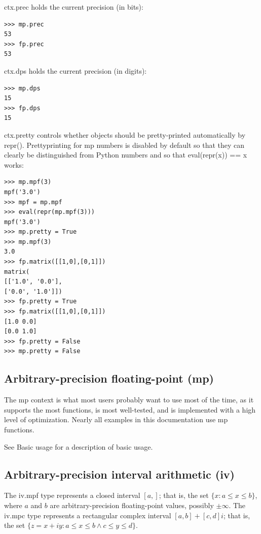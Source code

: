 ctx.prec holds the current precision (in bits):

\begin{lstlisting}
>>> mp.prec
53
>>> fp.prec
53
\end{lstlisting}


ctx.dps holds the current precision (in digits):

\begin{lstlisting}
>>> mp.dps
15
>>> fp.dps
15
\end{lstlisting}


ctx.pretty controls whether objects should be pretty-printed automatically by repr(). Prettyprinting for mp numbers is disabled by default so that they can clearly be distinguished from Python numbers and so that eval(repr(x)) == x works:

\begin{lstlisting}
>>> mp.mpf(3)
mpf('3.0')
>>> mpf = mp.mpf
>>> eval(repr(mp.mpf(3)))
mpf('3.0')
>>> mp.pretty = True
>>> mp.mpf(3)
3.0
>>> fp.matrix([[1,0],[0,1]])
matrix(
[['1.0', '0.0'],
['0.0', '1.0']])
>>> fp.pretty = True
>>> fp.matrix([[1,0],[0,1]])
[1.0 0.0]
[0.0 1.0]
>>> fp.pretty = False
>>> mp.pretty = False
\end{lstlisting}



\subsection{Arbitrary-precision floating-point (mp)}  

The mp context is what most users probably want to use most of the time, as it supports the most functions, is most well-tested, and is implemented with a high level of optimization. Nearly all examples in this documentation use mp functions.

See Basic usage for a description of basic usage.


\subsection{Arbitrary-precision interval arithmetic (iv)}  

The iv.mpf type represents a closed interval $[a,]$; that is, the set $\{x: a \leq x \leq b\}$, where $a$ and $b $ are arbitrary-precision floating-point values, possibly $\pm\infty$. The iv.mpc type represents a rectangular complex interval $[a,b] + [c,d]i$; that is, the set $\{z=x+iy: a \leq x \leq b \wedge c \leq y \leq d\}$.

